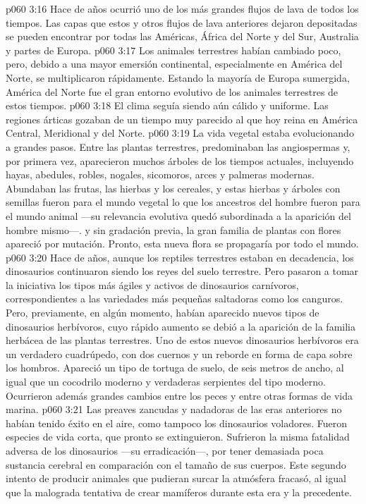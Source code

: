 \vs p060 3:16 \pc Hace  de años ocurrió uno de los más grandes flujos de lava de todos los tiempos. Las capas que estos y otros flujos de lava anteriores dejaron depositadas se pueden encontrar por todas las Américas, África del Norte y del Sur, Australia y partes de Europa.
\vs p060 3:17 Los animales terrestres habían cambiado poco, pero, debido a una mayor emersión continental, especialmente en América del Norte, se multiplicaron rápidamente. Estando la mayoría de Europa sumergida, América del Norte fue el gran entorno evolutivo de los animales terrestres de estos tiempos.
\vs p060 3:18 El clima seguía siendo aún cálido y uniforme. Las regiones árticas gozaban de un tiempo muy parecido al que hoy reina en América Central, Meridional y del Norte.
\vs p060 3:19 La vida vegetal estaba evolucionando a grandes pasos. Entre las plantas terrestres, predominaban las angiospermas y, por primera vez, aparecieron muchos árboles de los tiempos actuales, incluyendo hayas, abedules, robles, nogales, sicomoros, arces y palmeras modernas. Abundaban las frutas, las hierbas y los cereales, y estas hierbas y árboles con semillas fueron para el mundo vegetal lo que los ancestros del hombre fueron para el mundo animal ---su relevancia evolutiva quedó subordinada a la aparición del hombre mismo---.  y sin gradación previa, la gran familia de plantas con flores apareció por mutación. Pronto, esta nueva flora se propagaría por todo el mundo.
\vs p060 3:20 \pc Hace  de años, aunque los reptiles terrestres estaban en decadencia, los dinosaurios continuaron siendo los reyes del suelo terrestre. Pero pasaron a tomar la iniciativa los tipos más ágiles y activos de dinosaurios carnívoros, correspondientes a las variedades más pequeñas saltadoras como los canguros. Pero, previamente, en algún momento, habían aparecido nuevos tipos de dinosaurios herbívoros, cuyo rápido aumento se debió a la aparición de la familia herbácea de las plantas terrestres. Uno de estos nuevos dinosaurios herbívoros era un verdadero cuadrúpedo, con dos cuernos y un reborde en forma de capa sobre los hombros. Apareció un tipo de tortuga de suelo, de seis metros de ancho, al igual que un cocodrilo moderno y verdaderas serpientes del tipo moderno. Ocurrieron además grandes cambios entre los peces y entre otras formas de vida marina.
\vs p060 3:21 Las preaves zancudas y nadadoras de las eras anteriores no habían tenido éxito en el aire, como tampoco los dinosaurios voladores. Fueron especies de vida corta, que pronto se extinguieron. Sufrieron la misma fatalidad adversa de los dinosaurios ---su erradicación---, por tener demasiada poca sustancia cerebral en comparación con el tamaño de sus cuerpos. Este segundo intento de producir animales que pudieran surcar la atmósfera fracasó, al igual que la malograda tentativa de crear mamíferos durante esta era y la precedente.
